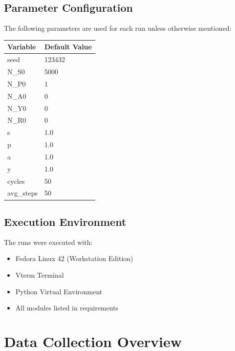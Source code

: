 \documentclass{article}
\begin{document}
\subsection{Parameter Configuration}
The following parameters are used for each run unless otherwise mentioned:

\begin{tabular}{| l | l |}
  \hline
  Variable  & Default Value \\ [0.5ex]
  \hline\hline
  seed      & 123432        \\
  \hline
  N\_S0     & 5000          \\
  \hline
  N\_P0     & 1             \\
  \hline
  N\_A0     & 0             \\
  \hline
  N\_Y0     & 0             \\
  \hline
  N\_R0     & 0             \\
  \hline
  s         & 1.0           \\
  \hline
  p         & 1.0           \\
  \hline
  a         & 1.0           \\
  \hline
  y         & 1.0           \\
  \hline
  cycles    & 50            \\
  \hline
  avg\_steps & 50            \\
  \hline\hline
\end{tabular}

\subsection{Execution Environment}
The runs were executed with:
\begin{itemize}
\item Fedora Linux 42 (Workstation Edition)
\item Vterm Terminal
\item Python Virtual Environment
\item All modules listed in requirements
\end{itemize}

\section{Data Collection Overview}
\end{document}
